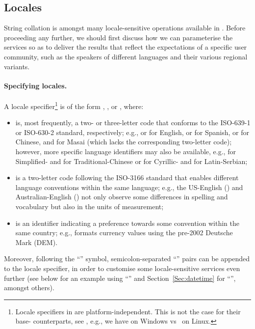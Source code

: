 \documentclass[nojss]{jss}
\begin{document}
\subsection{Locales}

String collation is amongst many locale-sensitive operations  available
in . Before proceeding any further, we should
first discuss how we can parameterise the  services
so as to deliver the results that reflect the expectations
of a specific user community, such as the speakers of different languages
and their various regional variants.

\paragraph{Specifying locales.}
A locale specifier\footnote{%
Locale specifiers in  are platform-independent.
This is not the case for their base- counterparts, see
, e.g., we have  on Windows
vs~ on Linux.}
is of the form
, , or ,
where:
\begin{itemize}
\item
{} is, most frequently, a two- or three-letter code that conforms to
the ISO-639-1 or ISO-630-2 standard, respectively;
e.g.,  or  for English,  or 
for Spanish,  or  for Chinese, and  for Masai
(which lacks the corresponding two-letter code);
however, more specific language identifiers may also be
available, e.g.,  for Simplified-
and  for Traditional-Chinese
or  for Cyrillic- and  for Latin-Serbian;


\item
{} is a two-letter code following the ISO-3166 standard
that enables different language conventions within the same language;
e.g., the US-English () and Australian-English ()
not only observe some differences in spelling and vocabulary but also
in the units of measurement;

\item
{} is an identifier indicating a preference towards
some convention within the same country; e.g., 
formats currency values using the pre-2002 Deutsche Mark (DEM).
\end{itemize}
Moreover,  following the
``'' symbol, semicolon-separated ``'' pairs
can be appended to the locale specifier, in order to
customise some locale-sensitive services even further
(see below for an example using ``''
and Section~\ref{Sec:datetime} for ``'', amongst others).
\end{document}
